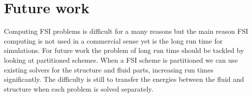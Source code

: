 \section{Future work}
Computing FSI problems is difficult for a many reasons but the main reason FSI computing is not used in a commercial sense yet is the long run time for simulations. For future work the problem of long run time should be tackled by looking at partitioned schemes. When a FSI scheme is partitioned we can use existing solvers for the structure and fluid parts, increasing run times significantly. The difficulty is still to transfer the energies between the fluid and structure when each problem is solved separately.  